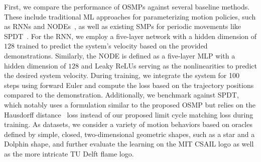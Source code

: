First, we compare the performance of \glspl{OSMP} against several baseline methods. These include traditional \gls{ML} approaches for parameterizing motion policies, such as \glspl{RNN} and \glspl{NODE}~\citep{chen2018neural}, as well as existing \glspl{SMP} for periodic movements like \gls{SPDT}~\citep{zhi2024teaching}. For the \gls{RNN}, we employ a five-layer network with a hidden dimension of $128$ trained to predict the system’s velocity based on the provided demonstrations. Similarly, the \gls{NODE} is defined as a five-layer \gls{MLP} with a hidden dimension of $128$ and Leaky ReLUs serving as the nonlinearities to predict the desired system velocity. During training, we integrate the system for 100 steps using forward Euler and compute the loss based on the trajectory positions compared to the demonstration. Additionally, we benchmark against \gls{SPDT}, which notably uses a formulation similar to the proposed \gls{OSMP} but relies on the Hausdorff distance~\citep{hausdorff1914grundzuge} loss instead of our proposed limit cycle matching loss during training. As datasets, we consider a variety of motion behaviors based on oracles defined by simple, closed, two-dimensional geometric shapes, such as a star and a Dolphin shape, and further evaluate the learning on the MIT CSAIL logo as well as the more intricate TU Delft flame logo.

